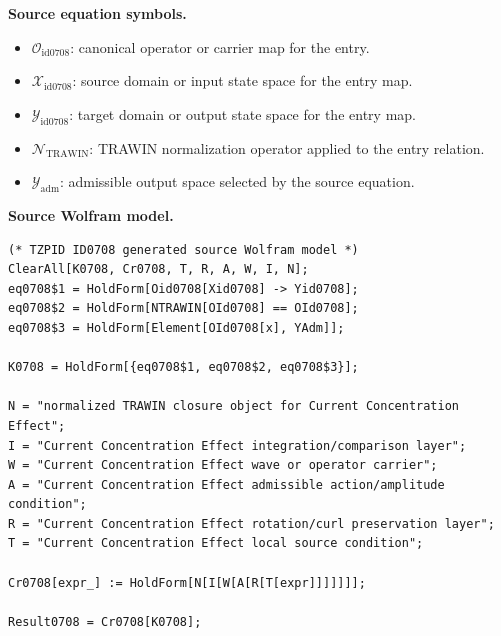 \begin{minipage}[t]{0.49\linewidth}
\begingroup
\small
\raggedright
\textbf{Source equation symbols.}\par
\begin{itemize}[leftmargin=1.35em,itemsep=1pt,topsep=1pt,parsep=0pt]
    \item $\mathcal{O}_{\mathrm{id0708}}$: canonical operator or carrier map for the entry.
    \item $\mathcal{X}_{\mathrm{id0708}}$: source domain or input state space for the entry map.
    \item $\mathcal{Y}_{\mathrm{id0708}}$: target domain or output state space for the entry map.
    \item $\mathcal{N}_{\mathrm{TRAWIN}}$: TRAWIN normalization operator applied to the entry relation.
    \item $\mathcal{Y}_{\mathrm{adm}}$: admissible output space selected by the source equation.
\end{itemize}
\endgroup
\end{minipage}\hfill
\begin{minipage}[t]{0.47\linewidth}
\begingroup
\scriptsize
\raggedright
\textbf{Source Wolfram model.}\par
\begin{Verbatim}[fontsize=\tiny,breaklines=true,breakanywhere=true]
(* TZPID ID0708 generated source Wolfram model *)
ClearAll[K0708, Cr0708, T, R, A, W, I, N];
eq0708$1 = HoldForm[Oid0708[Xid0708] -> Yid0708];
eq0708$2 = HoldForm[NTRAWIN[OId0708] == OId0708];
eq0708$3 = HoldForm[Element[OId0708[x], YAdm]];

K0708 = HoldForm[{eq0708$1, eq0708$2, eq0708$3}];

N = "normalized TRAWIN closure object for Current Concentration Effect";
I = "Current Concentration Effect integration/comparison layer";
W = "Current Concentration Effect wave or operator carrier";
A = "Current Concentration Effect admissible action/amplitude condition";
R = "Current Concentration Effect rotation/curl preservation layer";
T = "Current Concentration Effect local source condition";

Cr0708[expr_] := HoldForm[N[I[W[A[R[T[expr]]]]]]];

Result0708 = Cr0708[K0708];
\end{Verbatim}
\endgroup
\end{minipage}

